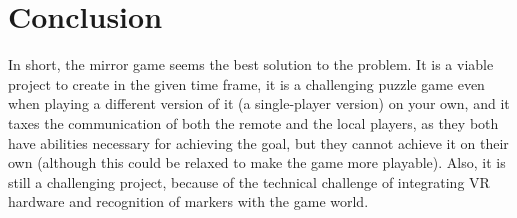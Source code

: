 \chapter{Conclusion} \label{cha:conclusion}
In short, the mirror game seems the best solution to the problem. It is a viable project
to create in the given time frame, it is a challenging puzzle game even when playing a 
different version of it (a single-player version) on your own, and it taxes the communication
of both the remote and the local players, as they both have abilities necessary for
achieving the goal, but they cannot achieve it on their own (although this could be relaxed
to make the game more playable). Also, it is still a challenging project, because of the
technical challenge of integrating VR hardware and recognition of markers with the game
world.  
	
